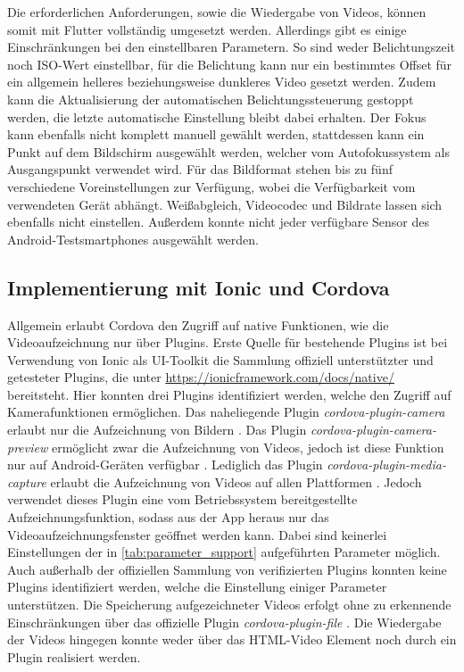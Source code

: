 Die erforderlichen Anforderungen, sowie die Wiedergabe von Videos, können somit mit Flutter vollständig umgesetzt werden.
Allerdings gibt es einige Einschränkungen bei den einstellbaren Parametern.
So sind weder Belichtungszeit noch ISO-Wert einstellbar, für die Belichtung kann nur ein bestimmtes Offset für ein allgemein helleres beziehungsweise dunkleres Video gesetzt werden.
Zudem kann die Aktualisierung der automatischen Belichtungssteuerung gestoppt werden, die letzte automatische Einstellung bleibt dabei erhalten.
Der Fokus kann ebenfalls nicht komplett manuell gewählt werden, stattdessen kann ein Punkt auf dem Bildschirm ausgewählt werden, welcher vom Autofokussystem als Ausgangspunkt verwendet wird.
Für das Bildformat stehen bis zu fünf verschiedene Voreinstellungen zur Verfügung, wobei die Verfügbarkeit vom verwendeten Gerät abhängt.
Weißabgleich, Videocodec und Bildrate lassen sich ebenfalls nicht einstellen.
Außerdem konnte nicht jeder verfügbare Sensor des Android-Testsmartphones ausgewählt werden.


\subsection{Implementierung mit Ionic und Cordova}
\label{sec:Evaluation_Ionic}

Allgemein erlaubt Cordova den Zugriff auf native Funktionen, wie die Videoaufzeichnung nur über Plugins.
Erste Quelle für bestehende Plugins ist bei Verwendung von Ionic als UI-Toolkit die Sammlung offiziell unterstützter und getesteter Plugins, die unter \url{https://ionicframework.com/docs/native/} bereitsteht.
Hier konnten drei Plugins identifiziert werden, welche den Zugriff auf Kamerafunktionen ermöglichen.
Das naheliegende Plugin \textit{cordova-plugin-camera} erlaubt nur die Aufzeichnung von Bildern \cite{Cordova_Camera}.
Das Plugin \textit{cordova-plugin-camera-preview} ermöglicht zwar die Aufzeichnung von Videos, jedoch ist diese Funktion nur auf Android-Geräten verfügbar \cite{Cordova_CameraPreview}.
Lediglich das Plugin \textit{cordova-plugin-media-capture} erlaubt die Aufzeichnung von Videos auf allen Plattformen \cite{Cordova_MediaCapture}.
Jedoch verwendet dieses Plugin eine vom Betriebssystem bereitgestellte Aufzeichnungsfunktion, sodass aus der App heraus nur das Videoaufzeichnungsfenster geöffnet werden kann.
Dabei sind keinerlei Einstellungen der in \autoref{tab:parameter_support} aufgeführten Parameter möglich.
Auch außerhalb der offiziellen Sammlung von verifizierten Plugins konnten keine Plugins identifiziert werden, welche die Einstellung einiger Parameter unterstützen.
Die Speicherung aufgezeichneter Videos erfolgt ohne zu erkennende Einschränkungen über das offizielle Plugin \textit{cordova-plugin-file} \cite{Cordova_File}.
Die Wiedergabe der Videos hingegen konnte weder über das HTML-Video Element noch durch ein Plugin realisiert werden. 

